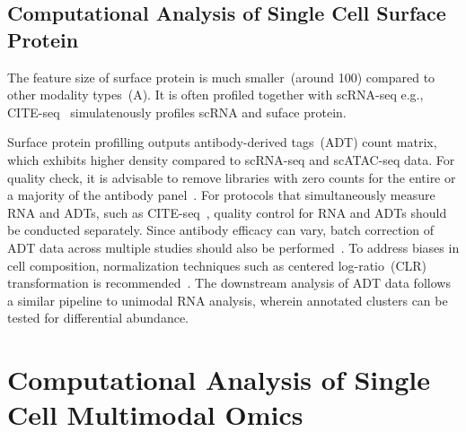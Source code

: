 \subsection{Computational Analysis of Single Cell Surface Protein}
\label{background:sec2:protein}
The feature size of surface protein is much smaller~(around 100) compared to other modality types~(A). It is often profiled together with scRNA-seq e.g., CITE-seq~\citep{citeseq2017} simulatenously profiles scRNA and suface protein.

Surface protein profilling outputs antibody-derived tags~(ADT) count matrix, which exhibits higher density compared to scRNA-seq and scATAC-seq data. For quality check, it is advisable to remove libraries with zero counts for the entire or a majority of the antibody panel~\citep{amezquita2020adtqc}. For protocols that simultaneously measure RNA and ADTs, such as CITE-seq~\citep{citeseq2017}, quality control for RNA and ADTs should be conducted separately. Since antibody efficacy can vary, batch correction of ADT data across multiple studies should also be performed~\citep{zheng2022adtqc}. To address biases in cell composition, normalization techniques such as centered log-ratio~(CLR) transformation is recommended~\citep{stoeckius2017citeseq}. The downstream analysis of ADT data follows a similar pipeline to unimodal RNA analysis, wherein annotated clusters can be tested for differential abundance.


\section{Computational Analysis of Single Cell Multimodal Omics}
\label{background:multimodal}

